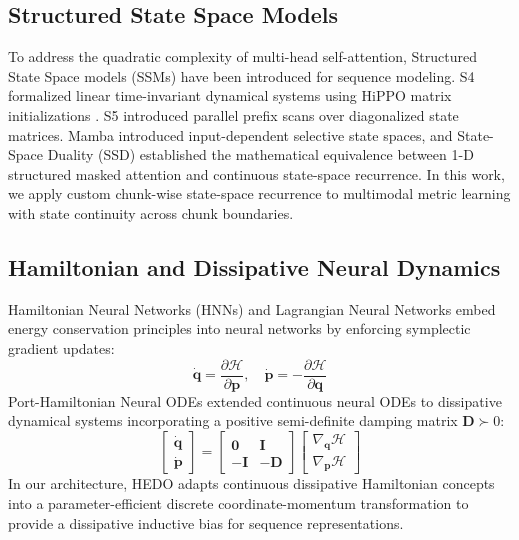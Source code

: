 \documentclass[journal]{IEEEtran}
\begin{document}
\subsection{Structured State Space Models}
To address the quadratic complexity of multi-head self-attention, Structured State Space models (SSMs) have been introduced for sequence modeling. S4 \cite{gu2021efficiently} formalized linear time-invariant dynamical systems using HiPPO matrix initializations \cite{gu2020hippo}. S5 \cite{smith2022simplified} introduced parallel prefix scans over diagonalized state matrices. Mamba \cite{gu2023mamba} introduced input-dependent selective state spaces, and State-Space Duality (SSD) \cite{dao2024transformers} established the mathematical equivalence between 1-D structured masked attention and continuous state-space recurrence. In this work, we apply custom chunk-wise state-space recurrence to multimodal metric learning with state continuity across chunk boundaries.

\subsection{Hamiltonian and Dissipative Neural Dynamics}
Hamiltonian Neural Networks (HNNs) \cite{greydanus2019hamiltonian} and Lagrangian Neural Networks \cite{cranmer2020lagrangian} embed energy conservation principles into neural networks by enforcing symplectic gradient updates:
\begin{equation}
\dot{\mathbf{q}} = \frac{\partial \mathcal{H}}{\partial \mathbf{p}}, \quad \dot{\mathbf{p}} = -\frac{\partial \mathcal{H}}{\partial \mathbf{q}}
\end{equation}
Port-Hamiltonian Neural ODEs \cite{port_hamiltonian_neural_odes} extended continuous neural ODEs to dissipative dynamical systems incorporating a positive semi-definite damping matrix $\mathbf{D} \succ 0$:
\begin{equation}
\begin{bmatrix} \dot{\mathbf{q}} \\ \dot{\mathbf{p}} \end{bmatrix} = \begin{bmatrix} \mathbf{0} & \mathbf{I} \\ -\mathbf{I} & -\mathbf{D} \end{bmatrix} \begin{bmatrix} \nabla_{\mathbf{q}} \mathcal{H} \\ \nabla_{\mathbf{p}} \mathcal{H} \end{bmatrix}
\end{equation}
In our architecture, HEDO adapts continuous dissipative Hamiltonian concepts into a parameter-efficient discrete coordinate-momentum transformation to provide a dissipative inductive bias for sequence representations.
\end{document}
